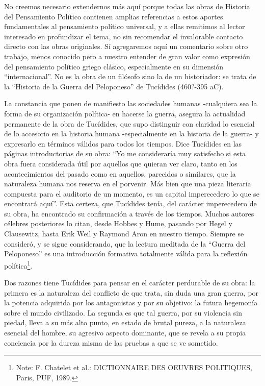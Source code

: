\documentclass[
]{book}
\begin{document}
No creemos necesario extendernos más aquí porque todas las obras de Historia del Pensamiento Político contienen amplias referencias a estos aportes fundamentales al pensamiento político universal, y a ellas remitimos al lector interesado en profundizar el tema, no sin recomendar el invalorable contacto directo con las obras originales. Sí agregaremos aquí un comentario sobre otro trabajo, menos conocido pero a nuestro entender de gran valor como expresión del pensamiento político griego clásico, especialmente en su dimensión ``internacional''. No es la obra de un filósofo sino la de un historiador: se trata de la ``Historia de la Guerra del Peloponeso'' de Tucídides (460?-395 aC).

La constancia que ponen de manifiesto las sociedades humanas -cualquiera sea la forma de su organización política- en hacerse la guerra, asegura la actualidad permanente de la obra de Tucídides, que supo distinguir con claridad lo esencial de lo accesorio en la historia humana -especialmente en la historia de la guerra- y expresarlo en términos válidos para todos los tiempos. Dice Tucídides en las páginas introductorias de su obra: ``Yo me consideraría muy satisfecho si esta obra fuera considerada útil por aquellos que quieran ver claro, tanto en los acontecimientos del pasado como en aquellos, parecidos o similares, que la naturaleza humana nos reserva en el porvenir. Más bien que una pieza literaria compuesta para el auditorio de un momento, es un capital imperecedero lo que se encontrará aquí''. Esta certeza, que Tucídides tenía, del carácter imperecedero de su obra, ha encontrado su confirmación a través de los tiempos. Muchos autores célebres posteriores lo citan, desde Hobbes y Hume, pasando por Hegel y Clausewitz, hasta Erik Weil y Raymond Aron en nuestro tiempo. Siempre se consideró, y se sigue considerando, que la lectura meditada de la ``Guerra del Peloponeso'' es una introducción formativa totalmente válida para la reflexión política\footnote{Note: F. Chatelet et al.: DICTIONNAIRE DES OEUVRES POLITIQUES, Paris, PUF, 1989.}.

Dos razones tiene Tucídides para pensar en el carácter perdurable de su obra: la primera es la naturaleza del conflicto de que trata, sin duda una gran guerra, por la potencia adquirida por los antagonistas y por su objetivo: la futura hegemonía sobre el mundo civilizado. La segunda es que tal guerra, por su violencia sin piedad, lleva a su más alto punto, en estado de brutal pureza, a la naturaleza esencial del hombre, su agresivo aspecto dominante, que se revela a su propia conciencia por la dureza misma de las pruebas a que se ve sometido.
\end{document}
